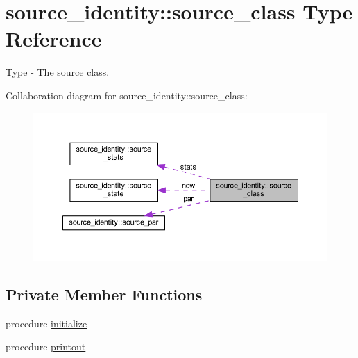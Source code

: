 \hypertarget{structsource__identity_1_1source__class}{}\section{source\+\_\+identity\+:\+:source\+\_\+class Type Reference}
\label{structsource__identity_1_1source__class}


Type -\/ The source class.  




Collaboration diagram for source\+\_\+identity\+:\+:source\+\_\+class\+:
\nopagebreak
\begin{figure}[H]
\begin{center}
\leavevmode
\includegraphics[width=350pt]{structsource__identity_1_1source__class__coll__graph}
\end{center}
\end{figure}
\subsection*{Private Member Functions}
\begin{DoxyCompactItemize}
\item 
procedure \mbox{\hyperlink{structsource__identity_1_1source__class_af232e5b647bcb16f34dcc2f797ef7a95}{initialize}}
\item 
procedure \mbox{\hyperlink{structsource__identity_1_1source__class_ac9866a62bf8838665bb929deff5bce24}{printout}}
\end{DoxyCompactItemize}
